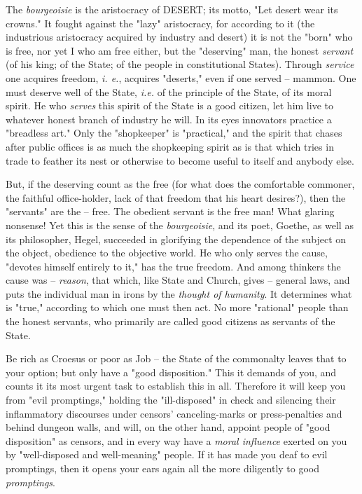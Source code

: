 The \textit{bourgeoisie} is the aristocracy of DESERT; its motto, "{}Let 
desert wear its crowns."{} It fought against the "{}lazy"{} aristocracy, for 
according to it (the industrious aristocracy acquired by industry and desert) 
it is not the "{}born"{} who is free, nor yet I who am free either, but the 
"{}deserving"{} man, the honest \textit{servant} (of his king; of the State; 
of the people in constitutional States). Through \textit{service} one acquires 
freedom, \textit{i. e.}, acquires "{}deserts,"{} even if one served -- mammon. 
One must deserve well of the State, \textit{i.e.} of the principle of the 
State, of its moral spirit. He who \textit{serves} this spirit of the State is 
a good citizen, let him live to whatever honest branch of industry he will. In 
its eyes innovators practice a "{}breadless art."{} Only the "{}shopkeeper"{} 
is "{}practical,"{} and the spirit that chases after public offices is as much 
the shopkeeping spirit as is that which tries in trade to feather its nest or 
otherwise to become useful to itself and anybody else.

But, if the deserving count as the free (for what does the comfortable 
commoner, the faithful office-holder, lack of that freedom that his heart 
desires?), then the "{}servants"{} are the -- free. The obedient servant is 
the free man! What glaring nonsense! Yet this is the sense of the 
\textit{bourgeoisie}, and its poet, Goethe, as well as its philosopher, Hegel, 
succeeded in glorifying the dependence of the subject on the object, obedience 
to the objective world. He who only serves the cause, "{}devotes himself 
entirely to it,"{} has the true freedom. And among thinkers the cause was -- 
\textit{reason}, that which, like State and Church, gives -- general laws, and 
puts the individual man in irons by the \textit{thought of humanity}. It 
determines what is "{}true,"{} according to which one must then act. No more 
"{}rational"{} people than the honest servants, who primarily are called good 
citizens as servants of the State.

Be rich as Croesus or poor as Job -- the State of the commonalty leaves that 
to your option; but only have a "{}good disposition."{} This it demands of 
you, and counts it its most urgent task to establish this in all. Therefore it 
will keep you from "{}evil promptings,"{} holding the "{}ill-disposed"{} in 
check and silencing their inflammatory discourses under censors' 
canceling-marks or press-penalties and behind dungeon walls, and will, on the 
other hand, appoint people of "{}good disposition"{} as censors, and in every 
way have a \textit{moral influence} exerted on you by "{}well-disposed and 
well-meaning"{} people. If it has made you deaf to evil promptings, then it 
opens your ears again all the more diligently to good \textit{promptings}.

